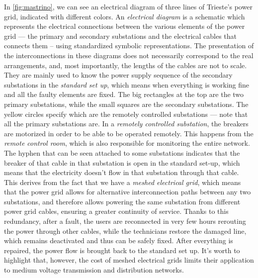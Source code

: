 In \autoref{fig:mastrino}, we can see an electrical diagram of three lines of Trieste's power grid, indicated with different colors. An \emph{electrical diagram} is a schematic which represents the electrical connections between the various elements of the power grid --- the primary and secondary substations and the electrical cables that connects them -- using standardized symbolic representations. The presentation of the interconnections in these diagrams does not necessarily correspond to the real arrangements, and, most importantly, the lengths of the cables are not to scale. They are mainly used to know the power supply sequence of the secondary substations in the \emph{standard set up}, which means when everything is working fine and all the faulty elements are fixed. The big rectangles at the top are the two primary substations, while the small squares are the secondary substations. The yellow circles specify which are the remotely controlled substations --- note that all the primary substations are. In a \emph{remotely controlled substation}, the breakers are motorized in order to be able to be operated remotely. This happens from the \emph{remote control room}, which is also responsible for monitoring the entire network. The hyphen that can be seen attached to some substations indicates that the breaker of that cable in that substation is open in the standard set-up, which means that the electricity doesn't flow in that substation through that cable. This derives from the fact that we have a \emph{meshed electrical grid}, which means that the power grid allows for alternative interconnection paths between any two substations, and therefore allows powering the same substation from different power grid cables, ensuring a greater continuity of service. Thanks to this redundancy, after a fault, the users are reconnected in very few hours rerouting the power through other cables, while the technicians restore the damaged line, which remains deactivated and thus can be safely fixed. After everything is repaired, the power flow is brought back to the standard set up. It's worth to highlight that, however, the cost of meshed electrical grids limits their application to medium voltage transmission and distribution networks.

